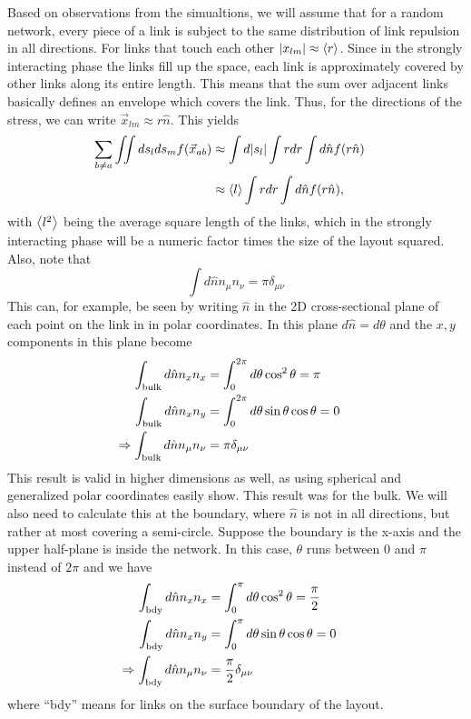 \documentclass[nofootinbib,preprint,floatfix,titlepage,endfloats,superscriptaddress]{revtex4} %
\begin{document}
Based on observations from the simualtions, we will assume that for a random network, every piece of a link is subject to the same distribution of link repulsion in all directions. 
For links that touch each other $|x_{lm}| \approx \left<r\right>$. 
Since in the strongly interacting phase the links fill up the space, each link is approximately covered by other links along its entire length. This means that the sum over adjacent links basically defines an envelope which covers the link.
Thus, for the directions of the stress,  we can write $\vec{x}_{lm} \approx  r\hat{n}$. 
This yields 
\begin{align}
    \sum_{b\ne a} \iint ds_lds_m f(\vec{x}_{ab}) &  \approx \int d|s_l| \int r dr \int d\hat{n} f(r\hat{n})\cr 
    & \approx  \left<l\right>\int rdr\int d\hat{n} f(r\hat{n}),
    \label{eq:apr-int}
\end{align}
with $\left<l^2\right>$ being the average square length of the links, which in the strongly interacting phase will be a numeric factor times the size of the layout squared. 
Also, note that 
\begin{equation}
\int d\hat{n} n_\mu n_\nu =\pi \delta_{\mu\nu} 
\end{equation}
This can, for example, be seen by writing $\hat{n}$ in the 2D cross-sectional plane of each point on the link in 
in polar coordinates. 
In this plane $d\hat{n} = d\theta $ and  the $x,y$ components in this plane become
\begin{align}
    \int_\mathrm{bulk} d\hat{n} n_x n_x & = 
    \int_0^{2\pi} d\theta \cos^2 \theta = \pi \cr
    \int_\mathrm{bulk} d\hat{n} n_x n_y & = \int_0^{2\pi} d\theta \sin \theta \cos \theta = 0 \cr 
    \Rightarrow  \int_\mathrm{bulk} d\hat{n} n_\mu n_\nu & = \pi \delta_{\mu\nu} 
    \label{eq:nhat-bulk}
\end{align}
This result is valid in higher dimensions as well, as using spherical and generalized polar coordinates easily show. 
This result was for the bulk.
We will also need to calculate this at the boundary, where $\hat{n} $ is not in all directions, but rather at most covering a semi-circle. 
Suppose the boundary is the x-axis and the upper half-plane is inside the network.
In this case, $\theta$ runs between $0$ and $\pi$ instead of $2\pi$ and we have 
\begin{align}
    \int_\mathrm{bdy} d\hat{n} n_x n_x & = 
    \int_0^\pi d\theta \cos^2 \theta = {\pi\over 2}  \cr
    \int_\mathrm{bdy} d\hat{n} n_x n_y & = \int_0^\pi d\theta \sin \theta \cos \theta = 0 \cr 
    \Rightarrow  \int_\mathrm{bdy} d\hat{n} n_\mu n_\nu & = {\pi\over 2} \delta_{\mu\nu} 
    \label{eq:nhat-bdy}
\end{align}
where ``bdy'' means for links on the surface boundary of the layout. 
\end{document}
